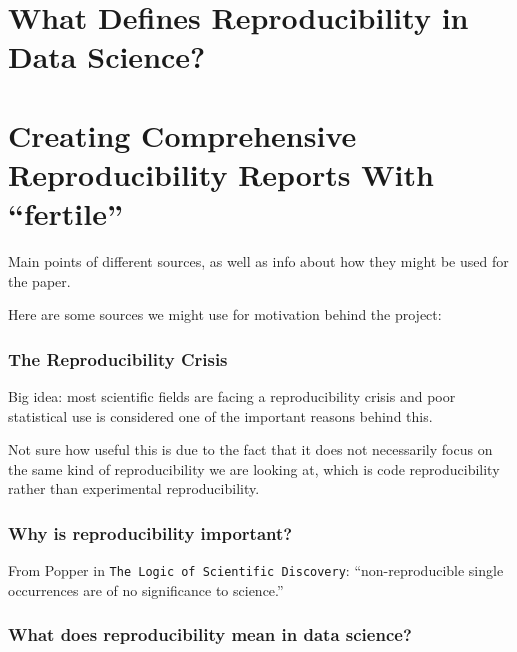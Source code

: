 \documentclass[12pt]{article}
\begin{document}
\section{What Defines Reproducibility in Data
Science?}\label{what-defines-reproducibility-in-data-science}

\section{\texorpdfstring{Creating Comprehensive Reproducibility Reports
With
``fertile''}{Creating Comprehensive Reproducibility Reports With fertile}}\label{creating-comprehensive-reproducibility-reports-with-fertile}

Main points of different sources, as well as info about how they might
be used for the paper.

Here are some sources we might use for motivation behind the project:

\subsubsection{The Reproducibility
Crisis}\label{the-reproducibility-crisis}

Big idea: most scientific fields are facing a reproducibility crisis and
poor statistical use is considered one of the important reasons behind
this.

Not sure how useful this is due to the fact that it does not necessarily
focus on the same kind of reproducibility we are looking at, which is
code reproducibility rather than experimental reproducibility.

\citet{baker20161}

\subsubsection{Why is reproducibility
important?}\label{why-is-reproducibility-important}

From Popper in \texttt{The\ Logic\ of\ Scientific\ Discovery}:
``non-reproducible single occurrences are of no significance to
science.''

\citet{popper2005logic}

\subsubsection{What does reproducibility mean in data
science?}\label{what-does-reproducibility-mean-in-data-science}
\end{document}
